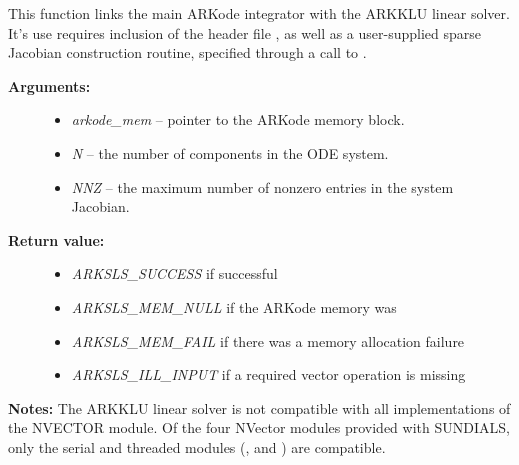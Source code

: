 \documentclass[letterpaper,10pt,english]{sphinxmanual}
\begin{document}

\begin{fulllineitems}
\label{c_interface/User_callable:c.ARKKLU}
This function links the main ARKode integrator with the ARKKLU
linear solver.  It's use requires inclusion of the header file
, as well as a user-supplied sparse Jacobian
construction routine, specified through a call to
{\hyperref[c_interface/User_callable:c.ARKSlsSetSparseJacFn]{\emph{}}}.
\begin{description}
\item[{\textbf{Arguments:}}] \leavevmode\begin{itemize}
\item {} 
\emph{arkode\_mem} -- pointer to the ARKode memory block.

\item {} 
\emph{N} -- the number of components in the ODE system.

\item {} 
\emph{NNZ} -- the maximum number of nonzero entries in the system
Jacobian.

\end{itemize}

\item[{\textbf{Return value:}}] \leavevmode\begin{itemize}
\item {} 
\emph{ARKSLS\_SUCCESS}   if successful

\item {} 
\emph{ARKSLS\_MEM\_NULL}  if the ARKode memory was 

\item {} 
\emph{ARKSLS\_MEM\_FAIL}  if there was a memory allocation failure

\item {} 
\emph{ARKSLS\_ILL\_INPUT} if a required vector operation is missing

\end{itemize}

\end{description}

\textbf{Notes:}  The ARKKLU linear solver is not compatible with
all implementations of the NVECTOR module.  Of the four NVector
modules provided with SUNDIALS, only the serial and threaded
modules ({\hyperref[nvectors/NVector_Serial:nvectors-nvserial]{\emph{}}}, {\hyperref[nvectors/NVector_OpenMP:nvectors-openmp]{\emph{}}} and
{\hyperref[nvectors/NVector_Pthreads:nvectors-pthreads]{\emph{}}}) are compatible.

\end{fulllineitems}
\end{document}
